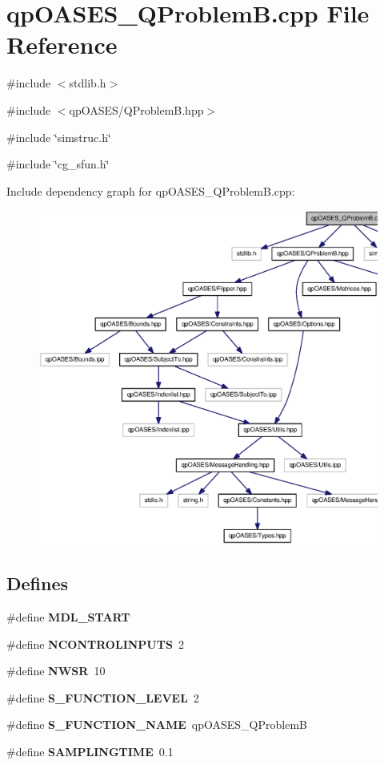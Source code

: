 \section{qpOASES\_\-QProblemB.cpp File Reference}
\label{qpOASES__QProblemB_8cpp}
{\ttfamily \#include $<$stdlib.h$>$}\par
{\ttfamily \#include $<$qpOASES/QProblemB.hpp$>$}\par
{\ttfamily \#include \char`\"{}simstruc.h\char`\"{}}\par
{\ttfamily \#include \char`\"{}cg\_\-sfun.h\char`\"{}}\par
Include dependency graph for qpOASES\_\-QProblemB.cpp:
\nopagebreak
\begin{figure}[H]
\begin{center}
\leavevmode
\includegraphics[width=400pt]{qpOASES__QProblemB_8cpp__incl}
\end{center}
\end{figure}
\subsection*{Defines}
\begin{DoxyCompactItemize}
\item 
\#define {\bf MDL\_\-START}
\item 
\#define {\bf NCONTROLINPUTS}~2
\item 
\#define {\bf NWSR}~10
\item 
\#define {\bf S\_\-FUNCTION\_\-LEVEL}~2
\item 
\#define {\bf S\_\-FUNCTION\_\-NAME}~qpOASES\_\-QProblemB
\item 
\#define {\bf SAMPLINGTIME}~0.1
\end{DoxyCompactItemize}
